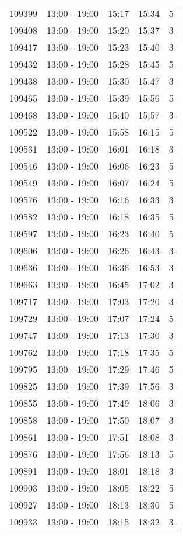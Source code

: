 \documentclass{article}
\begin{document}
\begin{tabular}{llccc}
109399 & 13:00 - 19:00 & 15:17 & 15:34 & 5 \\
109408 & 13:00 - 19:00 & 15:20 & 15:37 & 3 \\
109417 & 13:00 - 19:00 & 15:23 & 15:40 & 3 \\
109432 & 13:00 - 19:00 & 15:28 & 15:45 & 5 \\
109438 & 13:00 - 19:00 & 15:30 & 15:47 & 3 \\
109465 & 13:00 - 19:00 & 15:39 & 15:56 & 5 \\
109468 & 13:00 - 19:00 & 15:40 & 15:57 & 3 \\
109522 & 13:00 - 19:00 & 15:58 & 16:15 & 5 \\
109531 & 13:00 - 19:00 & 16:01 & 16:18 & 3 \\
109546 & 13:00 - 19:00 & 16:06 & 16:23 & 5 \\
109549 & 13:00 - 19:00 & 16:07 & 16:24 & 5 \\
109576 & 13:00 - 19:00 & 16:16 & 16:33 & 3 \\
109582 & 13:00 - 19:00 & 16:18 & 16:35 & 5 \\
109597 & 13:00 - 19:00 & 16:23 & 16:40 & 5 \\
109606 & 13:00 - 19:00 & 16:26 & 16:43 & 3 \\
109636 & 13:00 - 19:00 & 16:36 & 16:53 & 3 \\
109663 & 13:00 - 19:00 & 16:45 & 17:02 & 3 \\
109717 & 13:00 - 19:00 & 17:03 & 17:20 & 3 \\
109729 & 13:00 - 19:00 & 17:07 & 17:24 & 5 \\
109747 & 13:00 - 19:00 & 17:13 & 17:30 & 3 \\
109762 & 13:00 - 19:00 & 17:18 & 17:35 & 5 \\
109795 & 13:00 - 19:00 & 17:29 & 17:46 & 5 \\
109825 & 13:00 - 19:00 & 17:39 & 17:56 & 3 \\
109855 & 13:00 - 19:00 & 17:49 & 18:06 & 3 \\
109858 & 13:00 - 19:00 & 17:50 & 18:07 & 3 \\
109861 & 13:00 - 19:00 & 17:51 & 18:08 & 3 \\
109876 & 13:00 - 19:00 & 17:56 & 18:13 & 5 \\
109891 & 13:00 - 19:00 & 18:01 & 18:18 & 3 \\
109903 & 13:00 - 19:00 & 18:05 & 18:22 & 5 \\
109927 & 13:00 - 19:00 & 18:13 & 18:30 & 5 \\
109933 & 13:00 - 19:00 & 18:15 & 18:32 & 3 \\

\end{tabular}
\end{document}
